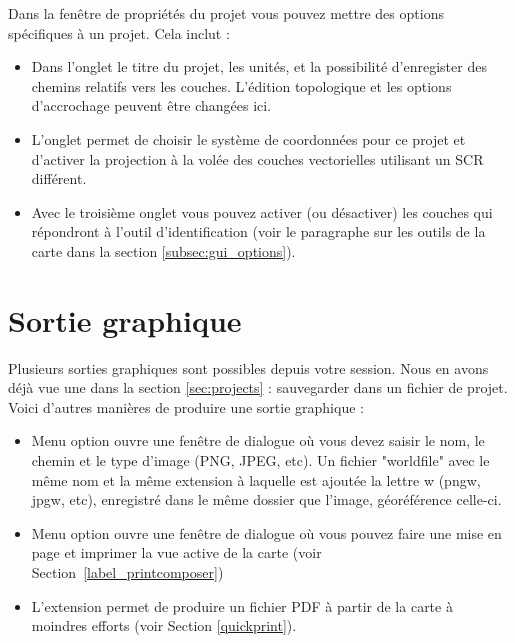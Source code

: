 Dans la fenêtre de propriétés du projet vous pouvez mettre des options spécifiques à un projet. Cela inclut :
\begin{itemize}[label=--]
 \item Dans l'onglet  le titre du projet, les unités, et la possibilité d'enregister des chemins relatifs vers les couches. L'édition topologique et les options d'accrochage peuvent être changées ici.
\item L'onglet  permet de choisir le système de coordonnées pour ce projet et d'activer la projection à la volée des couches vectorielles utilisant un SCR différent.
\item Avec le troisième onglet  vous pouvez activer (ou désactiver) les couches qui répondront à l'outil d'identification (voir le paragraphe sur les outils de la carte dans la section \ref{subsec:gui_options}).
\end{itemize}

\section{Sortie graphique} \label{sec:output}

Plusieurs sorties graphiques sont possibles depuis votre session. Nous en avons déjà vue une dans la section \ref{sec:projects} : sauvegarder dans un fichier de projet.
Voici d'autres manières de produire une sortie graphique :
\begin{itemize}[label=--]
\item Menu option  ouvre une fenêtre de dialogue où vous devez saisir le nom, le chemin et le type d'image (PNG, JPEG, etc). Un fichier "worldfile" avec le même nom et la même extension à laquelle est ajoutée la lettre w (pngw, jpgw, etc), enregistré dans le même dossier que l'image, géoréférence celle-ci.
\item Menu option  ouvre une fenêtre de dialogue où vous pouvez faire une mise en page et imprimer la vue active de la carte (voir Section~\ref{label_printcomposer})
\item L'extension  permet de produire un fichier PDF à partir de la carte à moindres efforts (voir Section \ref{quickprint}).
\end{itemize}

